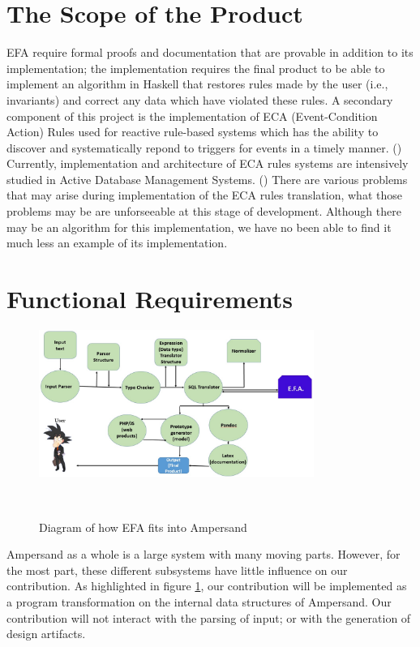 \documentclass[12pt]{report}
\begin{document}
\section{The Scope of the Product}\label{sec:ScopeOfProduct}
EFA require formal proofs and documentation that are provable in addition to its implementation; 
the implementation requires the final product to be able to implement an algorithm in Haskell that 
restores rules made by the user (i.e., invariants) and correct any data which have violated these 
rules. A secondary component of this project is the implementation of ECA (Event-Condition 
Action) Rules used for reactive rule-based systems which has the ability to discover and 
systematically repond to triggers for events in a timely manner. 
(\cite[p.182]{berstel})
Currently, implementation and architecture of ECA rules systems are intensively studied in Active 
Database Management Systems. (\cite[p.202]{berstel})
There are various problems that may arise during implementation of the ECA rules translation, 
what those problems may be are unforseeable at this stage of development. Although there may be an 
algorithm for this implementation, we have no been able to find it much less an example of its 
implementation.


\section{Functional Requirements}\label{sec:Functional}
\begin{figure}[!htb]
	\centering
	\includegraphics[width=0.8\textwidth]{../figures/functional}
	\caption{Diagram of how EFA fits into Ampersand}~\label{fig:figure2}
\end{figure}

Ampersand as a whole is a large system with many moving parts. However, for the
most part, these different subsystems have little influence on our contribution. 
As highlighted in figure \ref{fig:figure2}, our contribution will be implemented 
as a program transformation on the internal data structures of Ampersand. Our contribution
will not interact with the parsing of input; or with the generation of design artifacts.
 
\end{document}
